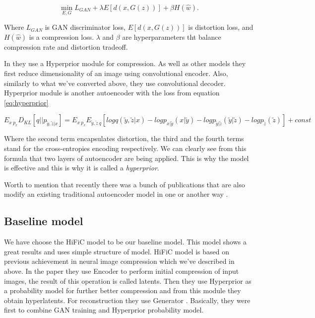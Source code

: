 \begin{equation}
    \label{eq:gan-compression}
    \min_{E,G} L_{GAN} + \lambda E[d(x, G(z))] + \beta H(\hat{w}).
\end{equation}

Where $L_{GAN}$ is GAN discriminator loss, $E[d(x, G(z))]$ is distortion loss, and $H(\hat{w})$ is a compression loss. $\lambda$ and $\beta$ are hyperparameters tht balance compression rate and distortion tradeoff.

In \cite{balle_variational_2018, mentzer_high_fidelity_2020} they use a Hyperprior module for compression. As well as other models they first reduce dimensionality of an image using convolutional encoder. Also, similarly to what we've converted above, they use convolutional decoder. Hyperprior module is another autoencoder with the loss from equation \ref{eq:hyperprior}

\begin{equation}
    \label{eq:hyperprior}
    E_{x~p_x} D_{KL}[q || p_{\tilde{y},\tilde{z}|x}] = E_{x~p_x} E_{\tilde{y}, \tilde{z}~q} [log q(\tilde{y}, \tilde{z} | x) − log p_{x|\tilde{y}}(x | \tilde{y}) − log p_{\tilde{y}| \tilde{z}}(\tilde{y}|\tilde{z}) − log p_{\tilde{z}}(\tilde{z}) ] + const
\end{equation}

Where the second term encapsulates distortion, the third and the fourth terms stand for the cross-entropies encoding respectively. We can clearly see from this formula that two layers of autoencoder are being applied. This is why the model is effective and this is why it is called a \textit{hyperprior}.

Worth to mention that recently there was a bunch of publications that are also modify an existing traditional autoencoder model in one or another way \cite{Zhou_2019_CVPR_Workshops, wang_substitutional_2021, lu_progressive_2021, liu_view_2021, liu_unified_2020, mentzer_practical_2020}.

\subsection{Baseline model}

We have choose the HiFiC \cite{mentzer_high_fidelity_2020} model to be our baseline model. This model shows a great results and uses simple structure of model. HiFiC model is based on previous achievement in neural image compression which we've described in above. In the paper they use Encoder \cite{conditional_gans} to perform initial compression of input images, the result of this operation is called latents. Then they use Hyperprior \cite{balle_variational_2018} as a probability model for further better compression and from this module they obtain hyperlatents. For reconstruction they use Generator \cite{conditional_gans}. Basically, they were first to combine GAN training \cite{agustsson_generative_2019} and Hyperprior probability model.


